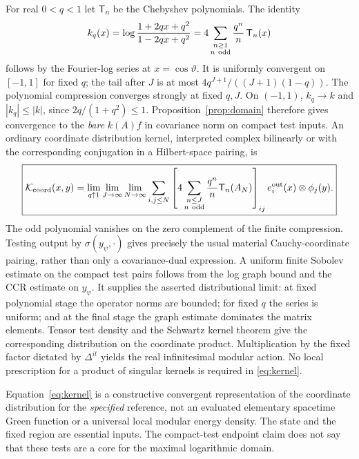 \documentclass[11pt]{article}
\begin{document}
For real \(0<q<1\) let \(\mathsf T_n\) be the Chebyshev polynomials. The identity
\begin{equation}
 k_q(x)=\log\frac{1+2qx+q^2}{1-2qx+q^2}
       =4\sum_{\substack{n\ge1\\ n\ {\rm odd}}}
          \frac{q^n}{n}\,\mathsf T_n(x)
 \label{eq:abel}
\end{equation}
follows by the Fourier-log series at \(x=\cos\vartheta\). It is uniformly convergent on \([-1,1]\) for fixed \(q\); the tail after \(J\) is at most \(4q^{J+1}/((J+1)(1-q))\). The polynomial compression converges strongly at fixed \(q,J\). On \((-1,1)\), \(k_q\to k\) and \(|k_q|\le |k|\), since \(2q/(1+q^2)\le1\). Proposition~\ref{prop:domain} therefore gives convergence to the \emph{bare} \(k(A)f\) in covariance norm on compact test inputs. An ordinary coordinate distribution kernel, interpreted complex bilinearly or with the corresponding conjugation in a Hilbert-space pairing, is
\begin{equation}
 \boxed{
 \mathcal K_{\rm coord}(x,y)=
 \lim_{q\uparrow1}\lim_{J\to\infty}\lim_{N\to\infty}
  \sum_{i,j\le N}
  \left[4\sum_{\substack{n\le J\\n\ {\rm odd}}}
        \frac{q^n}{n}\mathsf T_n(A_N)\right]_{ij}
  e_i^{\rm out}(x)\otimes\phi_j(y) .}
 \label{eq:kernel}
\end{equation}
The odd polynomial vanishes on the zero complement of the finite compression. Testing output by \(\sigma(y_\psi,\cdot)\) gives precisely the usual material Cauchy-coordinate pairing, rather than only a covariance-dual expression. A uniform finite Sobolev estimate on the compact test pairs follows from the log graph bound and the CCR estimate on \(y_\psi\). It supplies the asserted distributional limit: at fixed polynomial stage the operator norms are bounded; for fixed \(q\) the series is uniform; and at the final stage the graph estimate dominates the matrix elements. Tensor test density and the Schwartz kernel theorem give the corresponding distribution on the coordinate product. Multiplication by the fixed factor dictated by \(\Delta^{it}\) yields the real infinitesimal modular action. No local prescription for a product of singular kernels is required in \eqref{eq:kernel}.

Equation~\eqref{eq:kernel} is a constructive convergent representation of the coordinate distribution for the \emph{specified} reference, not an evaluated elementary spacetime Green function or a universal local modular energy density. The state and the fixed region are essential inputs. The compact-test endpoint claim does not say that these tests are a core for the maximal logarithmic domain.
\end{document}
